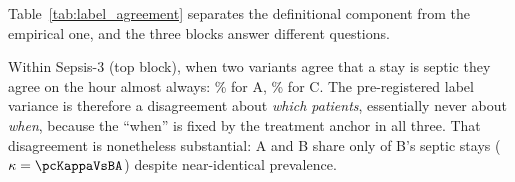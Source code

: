 \begin{table}[H]
    \centering\small
    \caption{Onset agreement with Variant B across all five comparison variants,
    on the \pcNStays{} shared stays. Counts are restricted to onsets inside the
    72\,h modelling horizon so that Variant D, whose onsets exist only within the
    panel, is comparable. ``Sens.\ to B'' is the fraction of B's labelled stays
    that the variant also labels; ``exact onset match'' is computed among stays
    labelled by both.}
    \label{tab:label_agreement}
\end{table}

Table~\ref{tab:label_agreement} separates the definitional component from the
empirical one, and the three blocks answer different questions.

Within Sepsis-3 (top block), when two variants agree that a stay is septic they
agree on the hour almost always: \pcPctExactMatchA\% for A, \pcPctExactMatchC\%
for C. The pre-registered label variance is therefore a disagreement about
\emph{which patients}, essentially never about \emph{when}, because the
``when'' is fixed by the treatment anchor in all three. That disagreement is
nonetheless substantial: A and B share only \pcSensToBA{} of B's septic stays
($\kappa = \pcKappaVsBA$) despite near-identical prevalence.

